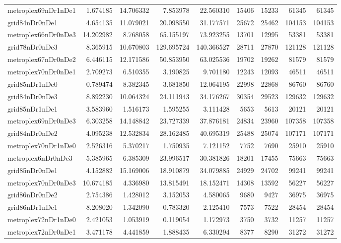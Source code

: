 \begin{longtable}{|l|r|r|r|r|r|r|r|r|}
metroplex69nDr1nDe1 & 1.674185 & 14.706332 & 7.853978 & 22.560310 & 15406 & 15233 & 61345 & 61345 \\
grid84nDr0nDe1 & 4.654135 & 11.079021 & 20.098550 & 31.177571 & 25672 & 25462 & 104153 & 104153 \\
metroplex66nDr0nDe3 & 14.202982 & 8.768058 & 65.155197 & 73.923255 & 13701 & 12995 & 53381 & 53381 \\
grid78nDr0nDe3 & 8.365915 & 10.670803 & 129.695724 & 140.366527 & 28711 & 27870 & 121128 & 121128 \\
metroplex67nDr0nDe2 & 6.446115 & 12.171586 & 50.853950 & 63.025536 & 19702 & 19262 & 81579 & 81579 \\
metroplex70nDr0nDe1 & 2.709273 & 6.510355 & 3.190825 & 9.701180 & 12243 & 12093 & 46511 & 46511 \\
grid85nDr1nDe0 & 0.789474 & 8.382345 & 3.681850 & 12.064195 & 22998 & 22868 & 86760 & 86760 \\
grid84nDr0nDe3 & 8.892230 & 10.064324 & 24.111943 & 34.176267 & 30354 & 29523 & 129632 & 129632 \\
grid85nDr1nDe1 & 3.583960 & 1.516173 & 1.595255 & 3.111428 & 5653 & 5613 & 20121 & 20121 \\
metroplex69nDr0nDe3 & 6.303258 & 14.148842 & 23.727339 & 37.876181 & 24834 & 23960 & 107358 & 107358 \\
grid84nDr0nDe2 & 4.095238 & 12.532834 & 28.162485 & 40.695319 & 25488 & 25074 & 107171 & 107171 \\
metroplex70nDr1nDe0 & 2.526316 & 5.370217 & 1.750935 & 7.121152 & 7752 & 7690 & 25910 & 25910 \\
metroplex6nDr0nDe3 & 5.385965 & 6.385309 & 23.996517 & 30.381826 & 18201 & 17455 & 75663 & 75663 \\
grid85nDr0nDe1 & 4.152882 & 15.169006 & 18.910879 & 34.079885 & 24929 & 24702 & 99241 & 99241 \\
metroplex70nDr0nDe3 & 10.674185 & 4.336980 & 13.815491 & 18.152471 & 14308 & 13592 & 56227 & 56227 \\
grid86nDr0nDe2 & 2.754386 & 1.428012 & 3.152053 & 4.580065 & 9680 & 9427 & 36975 & 36975 \\
grid86nDr1nDe1 & 8.208020 & 1.342090 & 0.783320 & 2.125410 & 7573 & 7522 & 28454 & 28454 \\
metroplex72nDr1nDe0 & 2.421053 & 1.053919 & 0.119054 & 1.172973 & 3750 & 3732 & 11257 & 11257 \\
metroplex72nDr0nDe1 & 3.471178 & 4.441859 & 1.888435 & 6.330294 & 8377 & 8290 & 31272 & 31272 \\

\end{longtable}
